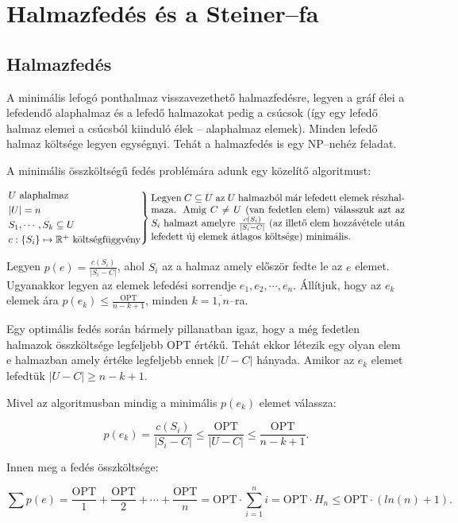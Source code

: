 \skiptooddpage 
\section{Halmazfedés és a Steiner--fa}

\subsection{Halmazfedés}
A minimális lefogó ponthalmaz visszavezethető halmazfedésre, legyen a gráf élei
a lefedendő alaphalmaz és a lefedő halmazokat pedig a csúcsok (így egy lefedő
halmaz elemei a csúcsból kiinduló élek -- alaphalmaz elemek). Minden lefedő
halmaz költsége legyen egységnyi. Tehát a halmazfedés is egy NP--nehéz feladat.

A minimális összköltségű fedés problémára adunk egy közelítő algoritmust:

\[
\begin{rcases}
U \mbox{ alaphalmaz} \\
|U| = n \\
S_1, \cdots, S_k \subseteq U \\
c : \{ S_i\} \mapsto \mathbb{R}^+ \mbox{ költségfüggvény} \end{rcases}
\parbox[L]{9cm} { Legyen $C\subseteq U$ az $U$ halmazból már lefedett elemek
részhalmaza. Amig $C \neq U$ (van fedetlen elem) válasszuk azt az $S_i$ halmazt
amelyre $\frac{c(S_i)}{|S_i-C|}$ (az illető elem hozzávétele után lefedett új
elemek átlagos költsége) minimális.
}
\]

Legyen $p(e)=\frac{c(S_i)}{|S_i-C|}$, ahol $S_i$ az a halmaz amely először fedte
le az $e$ elemet. Ugyanakkor legyen az elemek lefedési sorrendje $e_1, e_2,
\cdots, e_n$. Állítjuk, hogy az $e_k$ elemek ára 
$p(e_k) \leq \frac{\mbox{OPT}}{n-k+1}$, minden $k=\overline{1,n}$--ra.

Egy
optimális fedés során bármely pillanatban igaz, hogy a még fedetlen halmazok
összköltsége legfeljebb OPT értékű. Tehát ekkor létezik egy olyan elem e
halmazban amely értéke legfeljebb ennek $|U-C|$ hányada. Amikor az $e_k$ elemet
lefedtük $|U-C| \geq n-k+1$.

Mivel az algoritmusban mindig a minimális $p(e_k)$ elemet válassza:

\[p(e_k)=\frac{c(S_i)}{|S_i-C|} \leq \frac{\mbox{OPT}}{|U-C|} \leq  \frac{\mbox{OPT}}{n-k+1}.\]

Innen meg a fedés összköltsége:

\[\sum p(e) = \frac{\mbox{OPT}}{1} + \frac{\mbox{OPT}}{2} + \cdots + \frac{\mbox{OPT}}{n}= 
\mbox{OPT} \cdot \sum_{i=1}^n i = \mbox{OPT} \cdot H_n  \leq \mbox{OPT}  \cdot (ln(n)+1). \]

